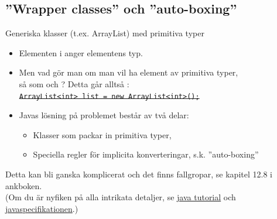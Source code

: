 \documentclass{lecturenotes}
\begin{document}
\subsection{''Wrapper classes'' och ''auto-boxing''}
\begin{Slide}{Generiska klasser (t.ex. ArrayList) med primitiva typer}
\begin{itemize}\footnotesize
\item Elementen i  anger elementens typ.
\item Men vad gör man om man vil ha element av primitiva typer, \\ så som  och ? 
Detta går alltså : \\
\sout{\texttt{ArrayList<int> list = new ArrayList<int>();}}

\vspace{2em}
\item Javas lösning på problemet består av två delar:
\begin{itemize}\footnotesize
\item Klasser som packar in primitiva typer, 
\item Speciella regler för implicita konverteringar, s.k. ''auto-boxing'' 
\end{itemize}
\end{itemize}
\scriptsize\vspace{1em}
Detta kan bli ganska komplicerat och det finns fallgropar, se kapitel 12.8 i ankboken.\\
(Om du är nyfiken på alla intrikata detaljer, se
\href{https://docs.oracle.com/javase/tutorial/java/data/autoboxing.html}{java tutorial} och   \href{https://docs.oracle.com/javase/specs/jls/se8/html/jls-5.html#jls-5.1.7}{javaspecifikationen}.)
\end{Slide}
\end{document}
